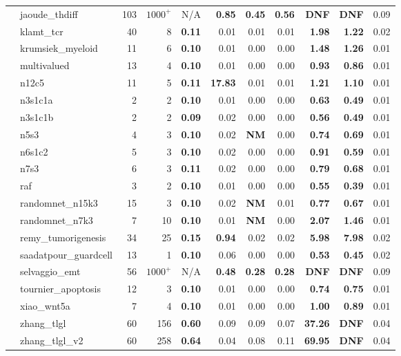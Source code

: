 \documentclass[preprint,12pt]{elsarticle}
\newcounter{rownumber}
\newcommand\rownb{\stepcounter{rownumber}\arabic{rownumber}}
\begin{document}
\begin{table}[!htb]
{\begin{tabular}{rlrrrrrrrrr}
    \rownb & jaoude\_thdiff & 103 & $1000^+$ & N/A & \textbf{0.85} & \textbf{0.45} & \textbf{0.56} & \textbf{DNF} & \textbf{DNF} & 0.09\\
    \rownb & klamt\_tcr & 40 & 8 & \textbf{0.11} & 0.01 & 0.01 & 0.01 & \textbf{1.98} & \textbf{1.22} & 0.02\\
    \rownb & krumsiek\_myeloid & 11 & 6 & \textbf{0.10} & 0.01 & 0.00 & 0.00 & \textbf{1.48} & \textbf{1.26} & 0.01\\
    \rownb & multivalued & 13 & 4 & \textbf{0.10} & 0.01 & 0.00 & 0.00 & \textbf{0.93} & \textbf{0.86} & 0.01\\
    \rownb & n12c5 & 11 & 5 & \textbf{0.11} & \textbf{17.83} & 0.01 & 0.01 & \textbf{1.21} & \textbf{1.10} & 0.01\\
    \rownb & n3s1c1a & 2 & 2 & \textbf{0.10} & 0.01 & 0.00 & 0.00 & \textbf{0.63} & \textbf{0.49} & 0.01\\
    \rownb & n3s1c1b & 2 & 2 & \textbf{0.09} & 0.02 & 0.00 & 0.00 & \textbf{0.56} & \textbf{0.49} & 0.01\\
    \rownb & n5s3 & 4 & 3 & \textbf{0.10} & 0.02 & \textbf{NM} & 0.00 & \textbf{0.74} & \textbf{0.69} & 0.01\\
    \rownb & n6s1c2 & 5 & 3 & \textbf{0.10} & 0.02 & 0.00 & 0.00 & \textbf{0.91} & \textbf{0.59} & 0.01\\
    \rownb & n7s3 & 6 & 3 & \textbf{0.11} & 0.02 & 0.00 & 0.00 & \textbf{0.79} & \textbf{0.68} & 0.01\\
    \rownb & raf & 3 & 2 & \textbf{0.10} & 0.01 & 0.00 & 0.00 & \textbf{0.55} & \textbf{0.39} & 0.01\\
    \rownb & randomnet\_n15k3 & 15 & 3 & \textbf{0.10} & 0.02 & \textbf{NM} & 0.01 & \textbf{0.77} & \textbf{0.67} & 0.01\\
    \rownb & randomnet\_n7k3 & 7 & 10 & \textbf{0.10} & 0.01 & \textbf{NM} & 0.00 & \textbf{2.07} & \textbf{1.46} & 0.01\\
    \rownb & remy\_tumorigenesis & 34 & 25 & \textbf{0.15} & \textbf{0.94} & 0.02 & 0.02 & \textbf{5.98} & \textbf{7.98} & 0.02\\
    \rownb & saadatpour\_guardcell & 13 & 1 & \textbf{0.10} & 0.06 & 0.00 & 0.00 & \textbf{0.53} & \textbf{0.45} & 0.02\\
    \rownb & selvaggio\_emt & 56 & $1000^+$ & N/A & \textbf{0.48} & \textbf{0.28} & \textbf{0.28} & \textbf{DNF} & \textbf{DNF} & 0.09\\
    \rownb & tournier\_apoptosis & 12 & 3 & \textbf{0.10} & 0.01 & 0.00 & 0.00 & \textbf{0.74} & \textbf{0.75} & 0.01\\
    \rownb & xiao\_wnt5a & 7 & 4 & \textbf{0.10} & 0.01 & 0.00 & 0.00 & \textbf{1.00} & \textbf{0.89} & 0.01\\
    \rownb & zhang\_tlgl & 60 & 156 & \textbf{0.60} & 0.09 & 0.09 & 0.07 & \textbf{37.26} & \textbf{DNF} & 0.04\\
    \rownb & zhang\_tlgl\_v2 & 60 & 258 & \textbf{0.64} & 0.04 & 0.08 & 0.11 & \textbf{69.95} & \textbf{DNF} & 0.04\\
    \bottomrule
  \end{tabular}
  }
\end{table}
\setcounter{rownumber}{0}
\end{document}
